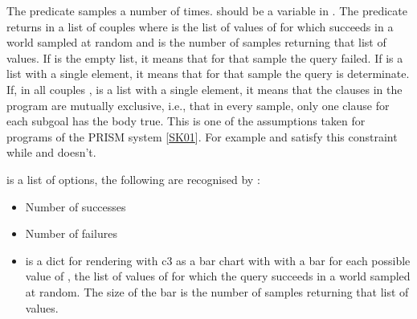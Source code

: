 \documentclass[letterpaper,10pt,english]{sphinxmanual}
\begin{document}
\sphinxAtStartPar
The predicate samples  a number of  times.  should be a variable in .
The predicate returns in  a list of couples  where  is the list of values of  for which  succeeds in a world sampled at random and  is the number of samples returning that list of values. If  is the empty list, it means that for that sample the query failed.
If  is a list with a single element, it means that for that sample the query is determinate.
If, in all couples ,  is a list with a single element, it means that the clauses in the program are mutually exclusive, i.e., that in every sample, only one clause for each subgoal has the body true.
This is one of the assumptions taken for programs of the PRISM system {[}\hyperlink{cite.index:id50}{SK01}{]}.
For example  and  satisfy this constraint while  and  doesn’t.

\sphinxAtStartPar
{} is a list of options, the following are recognised by :
\begin{itemize}
\item {} 
\sphinxAtStartPar
{} Number of successes

\item {} 
\sphinxAtStartPar
{} Number of failures

\item {} 
\sphinxAtStartPar
{}  is a dict for rendering with c3 as a bar chart with with a bar for each possible value of , the list of values of  for which the query succeeds in a world sampled at random. The size of the bar is the number of samples returning that list of values.

\end{itemize}
\end{document}
